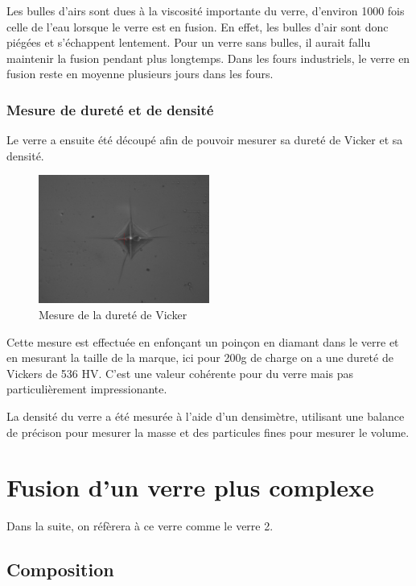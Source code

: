 \documentclass{article}
\begin{document}
Les bulles d'airs sont dues à la viscosité importante du verre, d'environ 1000 fois celle de l'eau lorsque le verre est en fusion. En effet, les bulles d'air sont donc piégées et s'échappent lentement. Pour un verre sans bulles, il aurait fallu maintenir la fusion pendant plus longtemps. Dans les fours industriels, le verre en fusion reste en moyenne plusieurs jours dans les fours.

\subsubsection{Mesure de dureté et de densité}

Le verre a ensuite été découpé afin de pouvoir mesurer sa dureté de Vicker et sa densité. 


\begin{figure}[h]
    \centering
    \includegraphics[width=0.5\textwidth]{photos/dureté.jpg}
    \caption{Mesure de la dureté de Vicker}
\end{figure}

Cette mesure est effectuée en enfonçant un poinçon en diamant dans le verre et en mesurant la taille de la marque, ici pour 200g de charge on a une dureté de Vickers de 536 HV. C'est une valeur cohérente pour du verre mais pas particulièrement impressionante.


La densité du verre a été mesurée à l'aide d'un densimètre, utilisant une balance de précison pour mesurer la masse et des particules fines pour mesurer le volume. 

\section{Fusion d'un verre plus complexe}
Dans la suite, on réfèrera à ce verre comme le verre 2.

\subsection{Composition}
\end{document}
